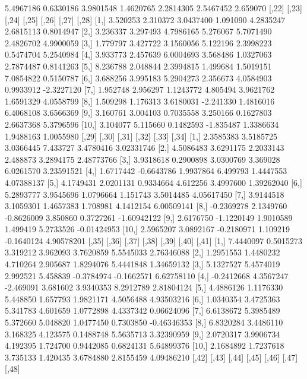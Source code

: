 \documentclass[12pt]{article}
\begin{document}
\begin{Schunk}
\begin{Soutput}
[10,]  5.4967186  0.6330186  3.9801548 1.4620765  2.2814305  2.5467452 2.659070
         [,22]    [,23]     [,24]     [,25]     [,26]     [,27]      [,28]
 [1,] 3.520253 2.310372 3.0437400  1.091090 4.2835247 2.6815113  0.8014947
 [2,] 3.236337 3.297493 4.7986165  5.276067 5.7071490 2.4826702  4.9900059
 [3,] 1.779797 3.427722 3.1560056  5.122196 2.3998223 0.5474704  5.2540984
 [4,] 3.933773 2.457639 6.0004693  3.568486 1.0327063 2.7874487  0.8141263
 [5,] 8.236788 2.048844 2.3994815  1.499684 1.5019151 7.0854822  0.5150787
 [6,] 3.688256 3.995183 5.2904273  2.356673 4.0584903 0.9933912 -2.3227120
 [7,] 1.952748 2.956297 1.1243772  4.805494 3.9621762 1.6591329  4.0558799
 [8,] 1.509298 1.176313 3.6180031 -2.241330 1.4816016 6.4068108  3.6566369
 [9,] 3.160761 3.004103 0.7035558  3.250166 0.1627803 2.6637368  5.3796596
[10,] 3.104077 5.115660 0.1482593 -1.835487 1.3386634 1.9488163  1.0055980
           [,29]      [,30]      [,31]    [,32]      [,33]       [,34]
 [1,]  2.3585383  3.5185725  3.0366445 7.433727  3.4780416  3.02331746
 [2,]  4.5086483  3.6291175  2.2033143 2.488873  3.2894175  2.48773766
 [3,]  3.9318618  0.2900898  3.0300769 3.369028  6.0261570  3.23591521
 [4,]  1.6717442 -0.6643786  1.9937864 6.499793  1.4447553  4.07388137
 [5,]  4.1749431  2.0201131  0.9334664 4.612256  3.4997600  1.39262040
 [6,]  5.2893777  3.9545696  1.0796664 1.151743  3.5014485  4.05617450
 [7,]  3.9144518  3.1059301  1.4657383 1.708981  4.1412154  6.00509141
 [8,] -0.2369278  2.1349760 -0.8626009 3.850860  0.3727261 -1.60942122
 [9,]  2.6176750 -1.1220149  1.9010589 1.499419  5.2733526 -0.01424953
[10,]  2.5965207  3.0892167 -0.2180971 1.109219 -0.1640124  4.90578201
           [,35]     [,36]     [,37]    [,38]      [,39]      [,40]       [,41]
 [1,]  7.4440097 0.5015273  3.319212 3.962093  3.7620859  5.5545033  2.76346088
 [2,]  1.2951553 1.4480232  4.710264 2.905687  1.8294076  5.4441848  1.34659132
 [3,]  5.1327527 5.4574019  2.992521 5.458839 -0.3784974 -0.1662571  6.62758110
 [4,] -0.2412668 4.3567247 -2.469091 3.681602  3.9340353  8.2912789  2.81804124
 [5,]  4.4886126 1.1176330  5.448850 1.657793  1.9821171  4.5056488  4.93503216
 [6,]  1.0340354 3.4725363  5.341783 4.601659  1.0772898  4.4337342  0.06624096
 [7,]  6.6138672 5.3985489  5.372660 5.048820  1.0477450  0.7303850 -0.46346353
 [8,]  6.8320284 3.4486110  3.168325 4.123575  0.1488748  5.5635713  3.32390959
 [9,]  2.0720317 3.9906734  4.192395 1.724700  0.9442085  0.6824131  5.64899376
[10,]  2.1684892 1.7237618  3.735133 1.420435  3.6784880  2.8155459  4.09486210
           [,42]    [,43]     [,44]     [,45]      [,46]    [,47]    [,48]

\end{Soutput}
\end{Schunk}
\end{document}
